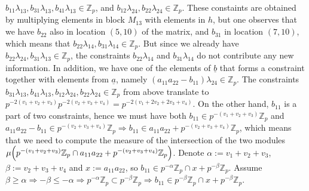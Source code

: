 \documentclass{article}
\begin{document}
$b_{11}\lambda_{13},b_{31}\lambda_{13},b_{41}\lambda_{13}\in\mathbb{Z}_{p}$, and $b_{12}\lambda_{24},b_{22}\lambda_{24}\in\mathbb{Z}_{p}$. These constaints are obtained by multiplying elements in block $M_{13}$ with elements in $h$, but one observes that we have $b_{22}$ also in location $(5,10)$ of the matrix, and $b_{31}$ in location $(7,10)$, which means that $b_{22}\lambda_{14},b_{31}\lambda_{14}\in\mathbb{Z}_{p}$. But since we already have $b_{22}\lambda_{24},b_{31}\lambda_{13}\in\mathbb{Z}_{p}$, the constraints $b_{22}\lambda_{14}$ and $b_{31}\lambda_{14}$ do not contribute any new information. In addition, we have one of the elements of $\underline{b}$ that forms a constraint together with elements from $\underline{a}$, namely $(a_{11}a_{22}-b_{11})\lambda_{24}\in\mathbb{Z}_{p}$. The constraints $b_{31}\lambda_{13},b_{41}\lambda_{13},b_{12}\lambda_{24},b_{22}\lambda_{24}\in\mathbb{Z}_{p}$ from above translate to $p^{-2(v_{1}+v_{2}+v_{3})}p^{-2(v_{2}+v_{3}+v_{4})}=p^{-2(v_{1}+2v_{2}+2v_{3}+v_{4})}$. On the other hand, $b_{11}$ is a part of two constraints, hence we must have both $b_{11}\in{p^{-(v_{1}+v_{2}+v_{3})}\mathbb{Z}_{p}}$ and $a_{11}a_{22}-b_{11}\in{p^{-(v_{2}+v_{3}+v_{4})}\mathbb{Z}_{p}}\Rightarrow{b_{11}\in{a_{11}a_{22}+p^{-(v_{2}+v_{3}+v_{4})}\mathbb{Z}_{p}}}$, which means that we need to compute the measure of the intersection of the two modules $\mu\Bigl(p^{-(v_{1}+v_{2}+v_{3})}\mathbb{Z}_{p}\cap{a_{11}a_{22}+p^{-(v_{2}+v_{3}+v_{4})}\mathbb{Z}_{p}\Bigr)}$. Denote $\alpha:=v_{1}+v_{2}+v_{3}$, $\beta:=v_{2}+v_{3}+v_{4}$ and $x:=a_{11}a_{22}$, so $b_{11}\in{p^{-\alpha}\mathbb{Z}_{p}\cap{x+p^{-\beta}}\mathbb{Z}_{p}}$. Assume $\beta\geq\alpha\Rightarrow{-\beta\leq-\alpha\Rightarrow{p^{-\alpha}\mathbb{Z}_{p}\subset{p^{-\beta}\mathbb{Z}_{p}}}}\Rightarrow{b_{11}\in{p^{-\beta}\mathbb{Z}_{p}\cap{x+p^{-\beta}}\mathbb{Z}_{p}}}$. 
\end{document}
